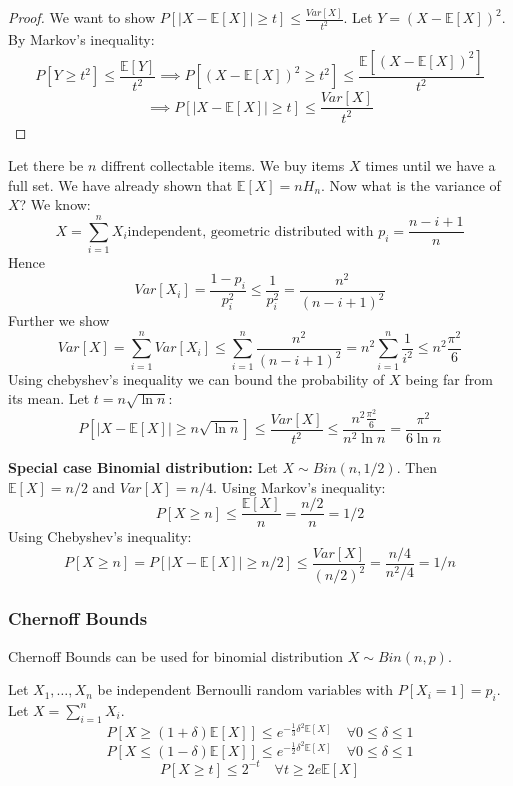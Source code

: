 \begin{proof}
We want to show $P[|X-\mathbb{E}[X]| \geq t] \leq \frac{Var[X]}{t^2}$.
Let $Y = (X-\mathbb{E}[X])^2$. By Markov's inequality:
$$P[Y \geq t^2] \leq \frac{\mathbb{E}[Y]}{t^2}  \implies  P[(X-\mathbb{E}[X])^2 \geq t^2] \leq \frac{\mathbb{E}[(X-\mathbb{E}[X])^2]}{t^2}$$
$$\implies P[|X-\mathbb{E}[X]| \geq t] \leq \frac{Var[X]}{t^2}$$
\end{proof}

\begin{example}
    Let there be $n$ diffrent collectable items. We buy items $X$ times until we have a full set. We have already shown that $\mathbb{E}[X] = n H_n$. Now what is the variance of $X$?
    We know:
    $$X = \sum_{i=1}^n X_i \text{independent, geometric distributed with } p_i = \frac{n-i+1}{n}$$
    Hence
    $$Var[X_i] = \frac{1-p_i}{p_i^2} \leq \frac{1}{p_i^2} = \frac{n^2}{(n-i+1)^2}$$
    Further we show
    $$Var[X] = \sum_{i=1}^n Var[X_i] \leq \sum_{i=1}^n \frac{n^2}{(n-i+1)^2} = n^2 \sum_{i=1}^n \frac{1}{i^2} \leq n^2 \frac{\pi^2}{6}$$
    Using chebyshev's inequality we can bound the probability of $X$ being far from its mean. Let $t = n  \sqrt{\ln n}$:
    $$P[|X-\mathbb{E}[X]| \geq n \sqrt{\ln n}] \leq \frac{Var[X]}{t^2} \leq \frac{n^2 \frac{\pi^2}{6}}{n^2 \ln n} = \frac{\pi^2}{6 \ln n}$$
    
\end{example}

\begin{example}
    \textbf{Special case Binomial distribution: } Let $X \sim Bin(n, 1/2)$. Then $\mathbb{E}[X] = n/2$ and $Var[X] = n/4$.
    Using Markov's inequality:
    $$P[X \geq n] \leq \frac{\mathbb{E}[X]}{n} = \frac{n/2}{n} = 1/2$$
    Using Chebyshev's inequality:
    $$P[X \geq n] = P[|X-\mathbb{E}[X]| \geq n/2] \leq \frac{Var[X]}{(n/2)^2} = \frac{n/4}{n^2/4} = 1/n$$
\end{example}

\subsubsection{Chernoff Bounds}

\begin{remark}
    Chernoff Bounds can be used for binomial distribution $X \sim Bin(n, p)$.
\end{remark}

\begin{theorem}
    Let $X_1, \dots, X_n$ be independent Bernoulli random variables with $P[X_i=1] = p_i$. Let $X = \sum_{i=1}^n X_i$.
    $$P[X \geq (1+\delta)\mathbb{E}[X]] \leq e^{-\frac{1}{3}\delta^2\mathbb{E}[X]} \quad \forall 0 \leq \delta \leq 1$$
    $$P[X \leq (1-\delta)\mathbb{E}[X]] \leq e^{-\frac{1}{2}\delta^2\mathbb{E}[X]} \quad \forall 0 \leq \delta \leq 1$$
    $$P[X \geq t] \leq 2^{-t} \quad \forall t \geq 2 e \mathbb{E}[X]$$
\end{theorem}

